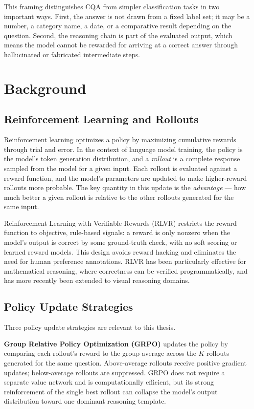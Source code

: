 \documentclass{iutbscthesis}
\begin{document}
This framing distinguishes CQA from simpler classification tasks in two important ways. First, the answer is not drawn from a fixed label set; it may be a number, a category name, a date, or a comparative result depending on the question. Second, the reasoning chain is part of the evaluated output, which means the model cannot be rewarded for arriving at a correct answer through hallucinated or fabricated intermediate steps.

\section{Background}

\subsection{Reinforcement Learning and Rollouts}

Reinforcement learning optimizes a policy by maximizing cumulative rewards through trial and error. In the context of language model training, the policy is the model's token generation distribution, and a \emph{rollout} is a complete response sampled from the model for a given input. Each rollout is evaluated against a reward function, and the model's parameters are updated to make higher-reward rollouts more probable. The key quantity in this update is the \emph{advantage} --- how much better a given rollout is relative to the other rollouts generated for the same input.

Reinforcement Learning with Verifiable Rewards (RLVR) restricts the reward function to objective, rule-based signals: a reward is only nonzero when the model's output is correct by some ground-truth check, with no soft scoring or learned reward models. This design avoids reward hacking and eliminates the need for human preference annotations. RLVR has been particularly effective for mathematical reasoning, where correctness can be verified programmatically, and has more recently been extended to visual reasoning domains.

\subsection{Policy Update Strategies}

Three policy update strategies are relevant to this thesis.

\textbf{Group Relative Policy Optimization (GRPO)} \cite{shao2024deepseekmath} updates the policy by comparing each rollout's reward to the group average across the $K$ rollouts generated for the same question. Above-average rollouts receive positive gradient updates; below-average rollouts are suppressed. GRPO does not require a separate value network and is computationally efficient, but its strong reinforcement of the single best rollout can collapse the model's output distribution toward one dominant reasoning template.
\end{document}
